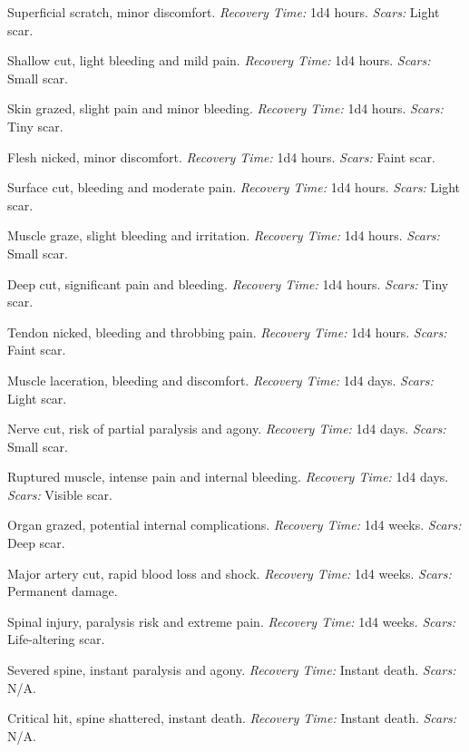 \documentclass[12pt]{book}
\begin{document}
\begin{description}[labelwidth=1.5em, leftmargin=*, itemsep=0.4em]
    \item[1 -] Superficial scratch, minor discomfort. \textit{Recovery Time:} 1d4 hours. \textit{Scars:} Light scar.
    \item[2 -] Shallow cut, light bleeding and mild pain. \textit{Recovery Time:} 1d4 hours. \textit{Scars:} Small scar.
    \item[3 -] Skin grazed, slight pain and minor bleeding. \textit{Recovery Time:} 1d4 hours. \textit{Scars:} Tiny scar.
    \item[4 -] Flesh nicked, minor discomfort. \textit{Recovery Time:} 1d4 hours. \textit{Scars:} Faint scar.
    \item[5 -] Surface cut, bleeding and moderate pain. \textit{Recovery Time:} 1d4 hours. \textit{Scars:} Light scar.
    \item[6 -] Muscle graze, slight bleeding and irritation. \textit{Recovery Time:} 1d4 hours. \textit{Scars:} Small scar.
    \item[7 -] Deep cut, significant pain and bleeding. \textit{Recovery Time:} 1d4 hours. \textit{Scars:} Tiny scar.
    \item[8 -] Tendon nicked, bleeding and throbbing pain. \textit{Recovery Time:} 1d4 hours. \textit{Scars:} Faint scar.
    \item[9 -] Muscle laceration, bleeding and discomfort. \textit{Recovery Time:} 1d4 days. \textit{Scars:} Light scar.
    \item[10 -] Nerve cut, risk of partial paralysis and agony. \textit{Recovery Time:} 1d4 days. \textit{Scars:} Small scar.
    \item[11 -] Ruptured muscle, intense pain and internal bleeding. \textit{Recovery Time:} 1d4 days. \textit{Scars:} Visible scar.
    \item[12 -] Organ grazed, potential internal complications. \textit{Recovery Time:} 1d4 weeks. \textit{Scars:} Deep scar.
    \item[13 -] Major artery cut, rapid blood loss and shock. \textit{Recovery Time:} 1d4 weeks. \textit{Scars:} Permanent damage.
    \item[14 -] Spinal injury, paralysis risk and extreme pain. \textit{Recovery Time:} 1d4 weeks. \textit{Scars:} Life-altering scar.
    \item[15 -] Severed spine, instant paralysis and agony. \textit{Recovery Time:} Instant death. \textit{Scars:} N/A.
    \item[16 -] Critical hit, spine shattered, instant death. \textit{Recovery Time:} Instant death. \textit{Scars:} N/A.

\end{description}
\end{document}
